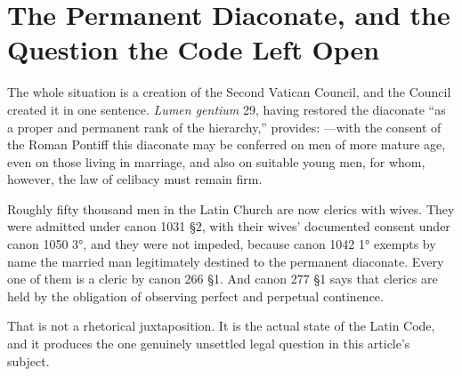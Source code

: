 \section{The Permanent Diaconate, and the Question the Code Left Open}

The whole situation is a creation of the Second Vatican Council, and the Council created it in one sentence. \emph{Lumen gentium} 29, having restored the diaconate ``as a proper and permanent rank of the hierarchy,'' provides: ---with the consent of the Roman Pontiff this diaconate may be conferred on men of more mature age, even on those living in marriage, and also on suitable young men, for whom, however, the law of celibacy must remain firm.

Roughly fifty thousand men in the Latin Church are now clerics with wives. They were admitted under canon 1031 §2, with their wives' documented consent under canon 1050 3°, and they were not impeded, because canon 1042 1° exempts by name the married man legitimately destined to the permanent diaconate. Every one of them is a cleric by canon 266 §1. And canon 277 §1 says that clerics are held by the obligation of observing perfect and perpetual continence.

That is not a rhetorical juxtaposition. It is the actual state of the Latin Code, and it produces the one genuinely unsettled legal question in this article's subject.


